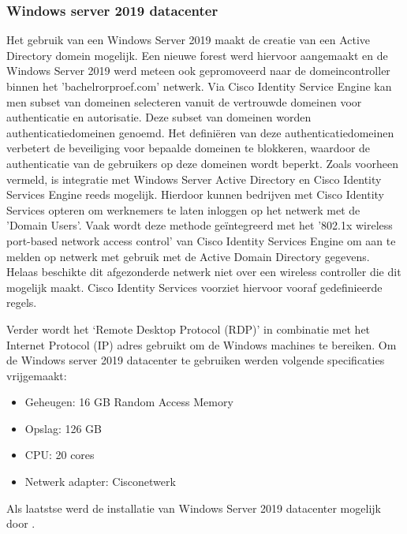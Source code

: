 \subsubsection{Windows server 2019 datacenter}
Het gebruik van een Windows Server 2019 maakt de creatie van een Active Directory domein mogelijk. Een nieuwe forest werd hiervoor aangemaakt en de Windows Server 2019 werd meteen ook gepromoveerd naar de domeincontroller binnen het 'bachelrorproef.com' netwerk.
\newline
\newline
Via Cisco Identity Service Engine kan men subset van domeinen selecteren vanuit de vertrouwde domeinen voor authenticatie en autorisatie. Deze subset van domeinen worden authenticatiedomeinen genoemd. Het definiëren van deze authenticatiedomeinen verbetert de beveiliging voor bepaalde domeinen te blokkeren, waardoor de authenticatie van de gebruikers op deze domeinen wordt beperkt.
\newline
\newline
Zoals voorheen vermeld, is integratie met Windows Server Active Directory en Cisco Identity Services Engine reeds mogelijk. Hierdoor kunnen bedrijven met Cisco Identity Services opteren om werknemers te laten inloggen op het netwerk met de 'Domain Users’. Vaak wordt deze methode geïntegreerd met het '802.1x wireless port-based network access control' van Cisco Identity Services Engine om aan te melden op netwerk met gebruik met de Active Domain Directory gegevens. Helaas beschikte dit afgezonderde netwerk niet over een wireless controller die dit mogelijk maakt. Cisco Identity Services voorziet hiervoor vooraf gedefinieerde regels.

Verder wordt het ‘Remote Desktop Protocol (RDP)’ in combinatie met het Internet Protocol (IP) adres gebruikt om de Windows machines te bereiken.
\newline
\newline
Om de Windows server 2019 datacenter te gebruiken werden volgende specificaties vrijgemaakt:

\begin{itemize}
	\item Geheugen: 16 GB Random Access Memory
	\item Opslag: 126 GB
	\item CPU: 20 cores
	\item Netwerk adapter: Cisco\textunderscore netwerk
\end{itemize}

Als laatstse werd de installatie van Windows Server 2019 datacenter mogelijk door \cite{Win19_InstallationGuide}. 

